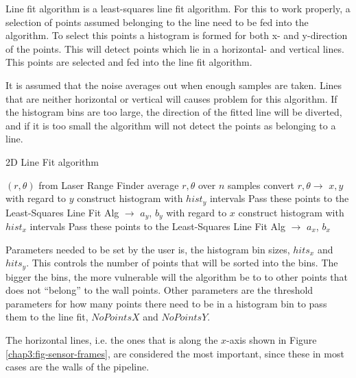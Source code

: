 Line fit algorithm is a least-squares line fit algorithm. For this to work properly, a
selection of points assumed belonging to the line need to be fed into the algorithm. To
select this points a histogram is formed for both x- and y-direction of the points. This
will detect points which lie in a horizontal- and vertical lines. This points are selected
and fed into the line fit algorithm. 

It is assumed that the noise averages out when
enough samples are taken. Lines that are neither horizontal or vertical
will causes problem for this algorithm. If the
histogram bins are too large, the direction of the fitted line will be diverted, and if it
is too small the algorithm will not detect the points as belonging to a line. 
\begin{algorithm}[htbp]
    \caption{2D Line Fit algorithm}
    \label{chap5:alg-2dlinefit}
    \begin{algorithmic}
        \REQUIRE $(r, \theta)$ from Laser Range Finder
        \STATE average $r, \theta$ over $n$ samples
        \STATE convert $r, \theta \rightarrow$ $x, y$ 
        \STATE with regard to $y$ construct histogram with $hist_y$ intervals
                \STATE Pass these points to the Least-Squares Line Fit Alg $\rightarrow$ $a_y$, $b_y$
            \ENDIF
        \ENDFOR
        \STATE with regard to $x$ construct histogram with $hist_x$ intervals
                \STATE Pass these points to the Least-Squares Line Fit Alg $\rightarrow$ $a_x$, $b_x$
            \ENDIF
        \ENDFOR
    \end{algorithmic}
\end{algorithm}

Parameters needed to be set by the user is, the histogram bin sizes, $hits_x$ and
$hits_y$. This controls the number of points that will be sorted into the bins. The bigger
the bins, the more vulnerable will the algorithm be to to
other points that does not ``belong'' to the wall points. Other parameters are the
threshold parameters for how many points there need to be in a histogram bin to pass them
to the line fit, $NoPointsX$ and $NoPointsY$.\

The horizontal lines, i.e. the ones that is along the $x$-axis shown in Figure
\ref{chap3:fig-sensor-frames}, are considered the most important, since these in most cases
are the walls of the pipeline. 

